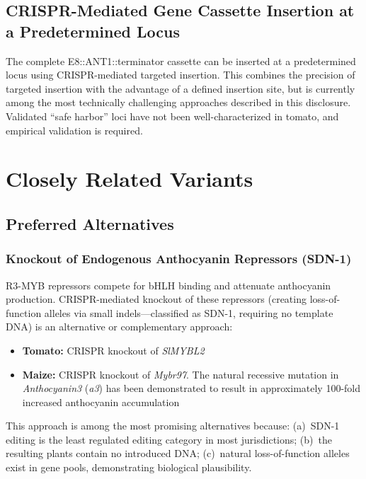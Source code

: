\documentclass[12pt,a4paper]{article}
\begin{document}
\subsection{CRISPR-Mediated Gene Cassette Insertion at a Predetermined Locus}

The complete E8::ANT1::terminator cassette can be inserted at a predetermined locus using CRISPR-mediated targeted insertion. This combines the precision of targeted insertion with the advantage of a defined insertion site, but is currently among the most technically challenging approaches described in this disclosure. Validated ``safe harbor'' loci have not been well-characterized in tomato, and empirical validation is required.

\section{Closely Related Variants}
\label{sec:variants}

\subsection{Preferred Alternatives}

\subsubsection{Knockout of Endogenous Anthocyanin Repressors (SDN-1)}

R3-MYB repressors compete for bHLH binding and attenuate anthocyanin production. CRISPR-mediated knockout of these repressors (creating loss-of-function alleles via small indels---classified as SDN-1, requiring no template DNA) is an alternative or complementary approach:

\begin{itemize}
  \item \textbf{Tomato:} CRISPR knockout of \textit{SlMYBL2}
  \item \textbf{Maize:} CRISPR knockout of \textit{Mybr97}. The natural recessive mutation in \textit{Anthocyanin3} (\textit{a3}) has been demonstrated to result in approximately 100-fold increased anthocyanin accumulation
\end{itemize}

This approach is among the most promising alternatives because: (a)~SDN-1 editing is the least regulated editing category in most jurisdictions; (b)~the resulting plants contain no introduced DNA; (c)~natural loss-of-function alleles exist in gene pools, demonstrating biological plausibility.
\end{document}
